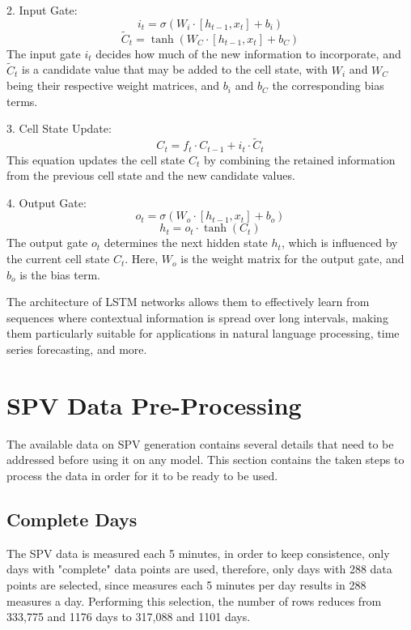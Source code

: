 \documentclass[a4paper,12pt]{article}
\begin{document}
2. Input Gate:
\begin{equation}
i_t = \sigma(W_i \cdot [h_{t-1}, x_t] + b_i)
\end{equation}
\begin{equation}
\tilde{C}_t = \tanh(W_C \cdot [h_{t-1}, x_t] + b_C)
\end{equation}
The input gate \(i_t\) decides how much of the new information to incorporate, and \(\tilde{C}_t\) is a candidate value that may be added to the cell state, with \(W_i\) and \(W_C\) being their respective weight matrices, and \(b_i\) and \(b_C\) the corresponding bias terms.

3. Cell State Update:
\begin{equation}
C_t = f_t \cdot C_{t-1} + i_t \cdot \tilde{C}_t
\end{equation}
This equation updates the cell state \(C_t\) by combining the retained information from the previous cell state and the new candidate values.

4. Output Gate:
\begin{equation}
o_t = \sigma(W_o \cdot [h_{t-1}, x_t] + b_o)
\end{equation}
\begin{equation}
h_t = o_t \cdot \tanh(C_t)
\end{equation}
The output gate \(o_t\) determines the next hidden state \(h_t\), which is influenced by the current cell state \(C_t\). Here, \(W_o\) is the weight matrix for the output gate, and \(b_o\) is the bias term.

The architecture of LSTM networks allows them to effectively learn from sequences where contextual information is spread over long intervals, making them particularly suitable for applications in natural language processing, time series forecasting, and more.

\section{SPV Data Pre-Processing}
The available data on SPV generation contains several details that need to be addressed before using it on any model. This section contains the taken steps to process the data in order for it to be ready to be used.

\subsection{Complete Days}

The SPV data is measured each 5 minutes, in order to keep consistence, only days with "complete" data points are used, therefore, only days with 288 data points are selected, since measures each 5 minutes per day results in 288 measures a day. Performing this selection, the number of rows reduces from 333,775 and 1176 days to 317,088 and 1101 days.
\end{document}
